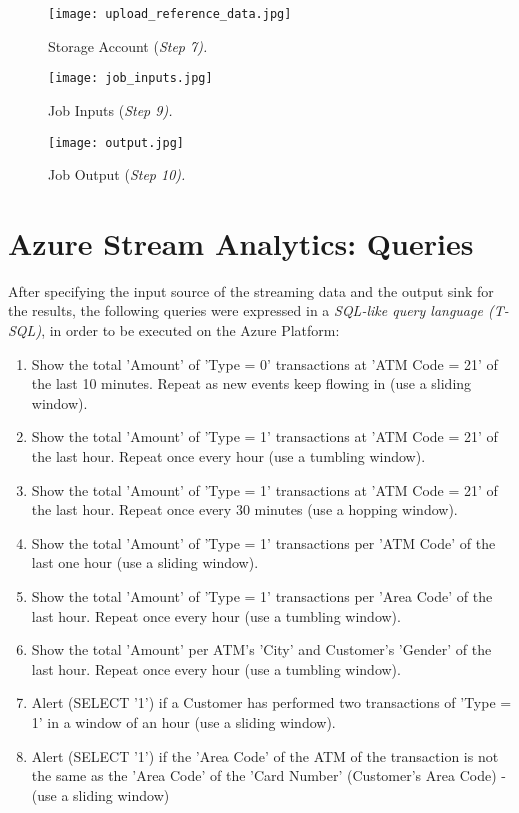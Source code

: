 \documentclass[12pt]{report}
\begin{document}
{\begin{figure}[H]
	\texttt{[image: upload\_reference\_data.jpg]}
	\caption{Storage Account (\textit{Step 7).}}
\end{figure}

\begin{figure}[H]
	\texttt{[image: job\_inputs.jpg]}
	\caption{Job Inputs (\textit{Step 9).}}
\end{figure}

\begin{figure}[H]
	\texttt{[image: output.jpg]}
	\caption{Job Output (\textit{Step 10).}}
\end{figure}

\newpage

\section{Azure Stream Analytics: Queries}

After specifying the input source of the streaming data and the output sink for the results, the following queries were expressed in a \textit{ SQL-like query language (T-SQL)}, in order to be executed on the Azure Platform:

\begin{enumerate}
\item Show the total 'Amount' of 'Type = 0' transactions at 'ATM Code = 21' of the last 10 minutes. Repeat as new events keep flowing in (use a sliding window).
\item Show the total 'Amount' of 'Type = 1' transactions at 'ATM Code = 21' of the last hour. Repeat once every hour (use a tumbling window).
\item Show the total 'Amount' of 'Type = 1' transactions at 'ATM Code = 21' of the last hour. Repeat once every 30 minutes (use a hopping window).
\item Show the total 'Amount' of 'Type = 1' transactions per 'ATM Code' of the last one hour (use a sliding window).
\item Show the total 'Amount' of 'Type = 1' transactions per 'Area Code' of the last hour. Repeat once every hour (use a tumbling window).
\item Show the total 'Amount' per ATM's 'City' and Customer's 'Gender' of the last hour. Repeat once every hour (use a tumbling window).
\item Alert (SELECT '1') if a Customer has performed two transactions of 'Type = 1' in a window of an hour (use a sliding window).
\item Alert (SELECT '1') if the 'Area Code' of the ATM of the transaction is not the same as the 'Area Code' of the 'Card Number' (Customer's Area Code) - (use a sliding window)
\end{enumerate}

}
\end{document}
